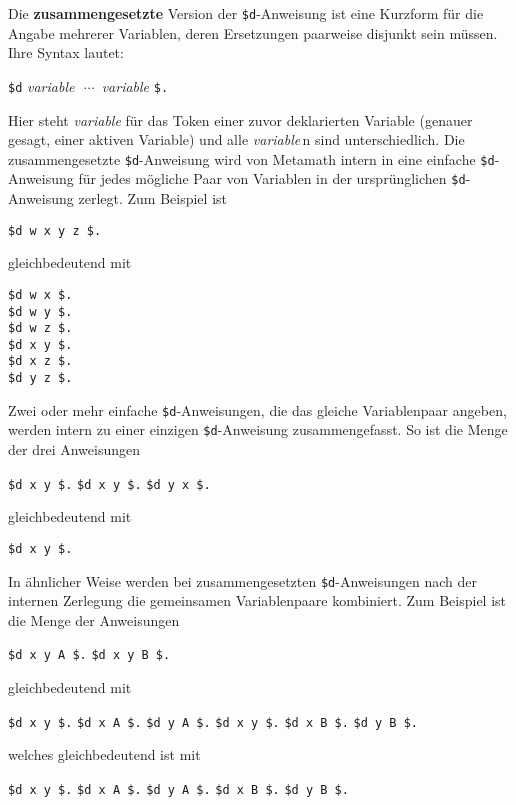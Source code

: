 Die {\bf zusammengesetzte} Version der \texttt{\$d}-Anweisung ist eine Kurzform für die Angabe mehrerer Variablen, deren Ersetzungen paarweise disjunkt sein müssen. Ihre Syntax lautet:
\begin{center}
  \texttt{\$d} {\em variable}\ \,$\cdots$\ {\em variable} \texttt{\$.}
\end{center}
Hier steht {\em variable} für das Token einer zuvor deklarierten Variable (genauer gesagt, einer aktiven Variable) und alle {\em variable}\,n sind unterschiedlich.  Die zusammengesetzte \texttt{\$d}-Anweisung wird von Metamath intern in eine einfache \texttt{\$d}-Anweisung für jedes mögliche Paar von Variablen in der ursprünglichen \texttt{\$d}-Anweisung zerlegt.  Zum Beispiel ist
\begin{center}
  \texttt{\$d w x y z \$.}
\end{center}
gleichbedeutend mit
\begin{center}
  \texttt{\$d w x \$.}\\
  \texttt{\$d w y \$.}\\
  \texttt{\$d w z \$.}\\
  \texttt{\$d x y \$.}\\
  \texttt{\$d x z \$.}\\
  \texttt{\$d y z \$.}
\end{center}

Zwei oder mehr einfache \texttt{\$d}-Anweisungen, die das gleiche Variablenpaar angeben, werden intern zu einer einzigen \texttt{\$d}-Anweisung zusammengefasst.  So ist die Menge der drei Anweisungen
\begin{center}
  \texttt{\$d x y \$.}
  \texttt{\$d x y \$.}
  \texttt{\$d y x \$.}
\end{center}
gleichbedeutend mit
\begin{center}
  \texttt{\$d x y \$.}
\end{center}

In ähnlicher Weise werden bei zusammengesetzten \texttt{\$d}-Anweisungen nach der internen Zerlegung die gemeinsamen Variablenpaare kombiniert.  Zum Beispiel ist die Menge der Anweisungen
\begin{center}
  \texttt{\$d x y A \$.}
  \texttt{\$d x y B \$.}
\end{center}
gleichbedeutend mit
\begin{center}
  \texttt{\$d x y \$.}
  \texttt{\$d x A \$.}
  \texttt{\$d y A \$.}
  \texttt{\$d x y \$.}
  \texttt{\$d x B \$.}
  \texttt{\$d y B \$.}
\end{center}
welches gleichbedeutend ist mit
\begin{center}
  \texttt{\$d x y \$.}
  \texttt{\$d x A \$.}
  \texttt{\$d y A \$.}
  \texttt{\$d x B \$.}
  \texttt{\$d y B \$.}
\end{center}

